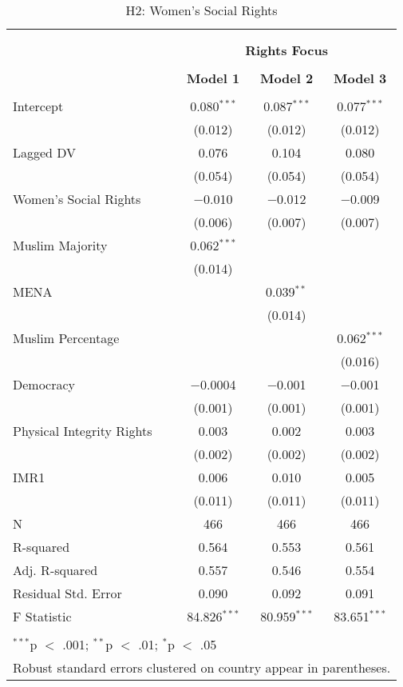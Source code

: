 
\begin{table}[!htbp] \centering 
  \caption{H2: Women's Social Rights} 
  \label{} 
\begin{tabular}{@{\extracolsep{5pt}}lccc} 
\\[-1.8ex]\hline \\[-1.8ex] 
\\[-1.8ex] & \multicolumn{3}{c}{\textbf{Rights Focus}} \\ 
\\[-1.8ex] & \textbf{Model 1} & \textbf{Model 2} & \textbf{Model 3}\\ 
\hline \\[-1.8ex] 
 Intercept & 0.080$^{***}$ & 0.087$^{***}$ & 0.077$^{***}$ \\ 
  & (0.012) & (0.012) & (0.012) \\ 
  Lagged DV & 0.076 & 0.104 & 0.080 \\ 
  & (0.054) & (0.054) & (0.054) \\ 
  Women's Social Rights & $-$0.010 & $-$0.012 & $-$0.009 \\ 
  & (0.006) & (0.007) & (0.007) \\ 
  Muslim Majority & 0.062$^{***}$ &  &  \\ 
  & (0.014) &  &  \\ 
  MENA &  & 0.039$^{**}$ &  \\ 
  &  & (0.014) &  \\ 
  Muslim Percentage &  &  & 0.062$^{***}$ \\ 
  &  &  & (0.016) \\ 
  Democracy & $-$0.0004 & $-$0.001 & $-$0.001 \\ 
  & (0.001) & (0.001) & (0.001) \\ 
  Physical Integrity Rights & 0.003 & 0.002 & 0.003 \\ 
  & (0.002) & (0.002) & (0.002) \\ 
  IMR1 & 0.006 & 0.010 & 0.005 \\ 
  & (0.011) & (0.011) & (0.011) \\ 
 N & 466 & 466 & 466 \\ 
R-squared & 0.564 & 0.553 & 0.561 \\ 
Adj. R-squared & 0.557 & 0.546 & 0.554 \\ 
Residual Std. Error & 0.090 & 0.092 & 0.091 \\ 
F Statistic & 84.826$^{***}$ & 80.959$^{***}$ & 83.651$^{***}$ \\ 
\hline \\[-1.8ex] 
\multicolumn{4}{l}{$^{***}$p $<$ .001; $^{**}$p $<$ .01; $^{*}$p $<$ .05} \\ 
\multicolumn{4}{l}{Robust standard errors clustered on country appear in parentheses.} \\ 
\end{tabular} 
\end{table} 
